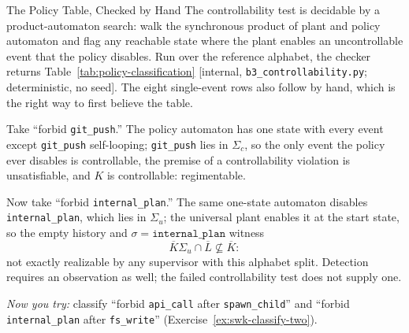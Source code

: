 \documentclass[11pt,a4paper]{article}
\theoremstyle{definition}
\theoremstyle{remark}
\begin{document}
\begin{pdexample}{The Policy Table, Checked by Hand}
\setlength{\parskip}{4pt plus 1pt}
The controllability test is decidable by a product-automaton search: walk the synchronous
product of plant and policy automaton and flag any reachable state where the plant enables an
uncontrollable event that the policy disables. Run over the reference alphabet, the checker
returns Table~\ref{tab:policy-classification} [internal, \texttt{b3\_controllability.py};
deterministic, no seed]. The eight single-event rows also follow by hand, which is the right
way to first believe the table.

Take ``forbid \texttt{git\_push}.'' The policy automaton has
one state with every event except \texttt{git\_push} self-looping; \texttt{git\_push} lies in
$\Sigma_c$, so the only event the policy ever disables is controllable, the premise of a
controllability violation is unsatisfiable, and $K$ is controllable: regimentable.

Now take
``forbid \texttt{internal\_plan}.'' The same one-state automaton disables
\texttt{internal\_plan}, which lies in $\Sigma_u$; the universal plant enables it at the start
state, so the empty history and $\sigma = \texttt{internal\_plan}$ witness
\[
\overline{K}\Sigma_u \cap \overline{L} \not\subseteq \overline{K}:
\]
not exactly realizable by any supervisor with this alphabet split.
Detection requires an observation as well; the failed controllability test
does not supply one.

\emph{Now you try:} classify ``forbid \texttt{api\_call}
after \texttt{spawn\_child}'' and ``forbid \texttt{internal\_plan} after \texttt{fs\_write}''
(Exercise~\ref{ex:swk-classify-two}).
\end{pdexample}
\end{document}
